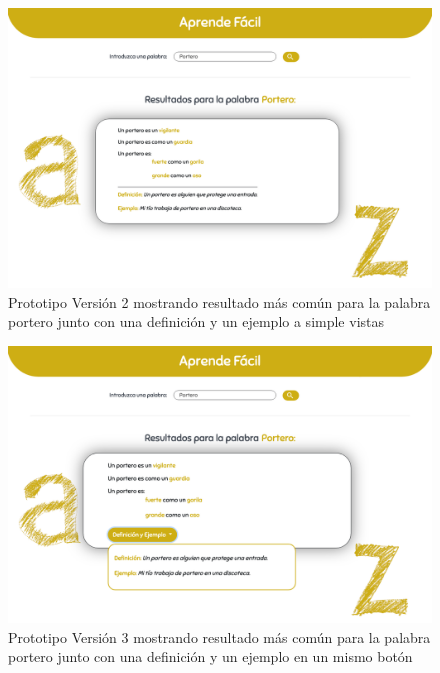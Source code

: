 	 	\begin{figure}[!t]
	 	\includegraphics[width=.8\textwidth]{Imagenes/Bitmap/Mockups/mockup2_irene_final_v2.png}
	 	\centering
	 	\caption{Prototipo Versión 2 mostrando resultado más común para la palabra portero junto con una definición y un ejemplo a simple vistas}
	 	\label{fig:mockup2irene_v2_vFinal}
	 \end{figure}
 
 	\begin{figure}[!t]
 	\includegraphics[width=.8\textwidth]{Imagenes/Bitmap/Mockups/mockup2_irene_final_v3.png}
 	\centering
 	\caption{Prototipo Versión 3 mostrando resultado más común para la palabra portero junto con una definición y un ejemplo en un mismo botón}
 	\label{fig:mockup2irene_v3_vFinal}
 \end{figure}

